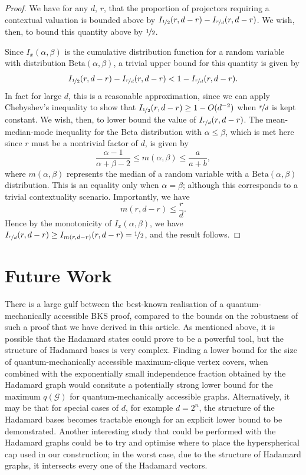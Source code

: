 \documentclass{amsart}
\theoremstyle{definition}
\begin{document}
\begin{proof}
We have for any $d$, $r$, that the proportion of projectors requiring a contextual valuation is bounded above by $I_{\nicefrac{1}{2}}(r,d-r)-I_{\nicefrac{r}{d}}(r,d-r)$. We wish, then, to bound this quantity above by $\nicefrac12$.

Since $I_x(\alpha,\beta)$ is the cumulative distribution function for a random variable with distribution $\mbox{Beta}(\alpha,\beta)$, a trivial upper bound for this quantity is given by
\begin{equation}
I_{\nicefrac{1}{2}}(r,d-r)-I_{\nicefrac{r}{d}}(r,d-r)< 1-I_{\nicefrac{r}{d}}(r,d-r).
\end{equation}
In fact for large $d$, this is a reasonable approximation, since we can apply Chebyshev's inequality to show that $I_{\nicefrac{1}{2}}(r,d-r)\geq1-O(d^{-2})$ when $\nicefrac{r}{d}$ is kept constant. We wish, then, to lower bound the value of $I_{\nicefrac{r}{d}}(r,d-r)$. The mean-median-mode inequality \cite{Kerm2011} for the Beta distribution with $\alpha\leq\beta$, which is met here since $r$ must be a nontrivial factor of $d$, is given by
\begin{equation}
\frac{\alpha-1}{\alpha+\beta-2}\leq m(\alpha,\beta)\leq\frac{a}{a+b},
\end{equation}
where $m(\alpha,\beta)$ represents the median of a random variable with a $\mbox{Beta}(\alpha,\beta)$ distribution. This is an equality only when $\alpha=\beta$; although this corresponds to a trivial contextuality scenario. Importantly, we have
\begin{equation}
m(r,d-r)\leq\frac{r}{d}.
\end{equation}
Hence by the monotonicity of $I_x(\alpha,\beta)$, we have $I_{\nicefrac{r}{d}}(r,d-r)\geq I_{m(r,d-r)}(r,d-r)=\nicefrac12$, and the result follows.

\end{proof}


\section{Future Work}
There is a large gulf between the best-known realisation of a quantum-mechanically accessible BKS proof, compared to the bounds on the robustness of such a proof that we have derived in this article. As mentioned above, it is possible that the Hadamard states could prove to be a powerful tool, but the structure of Hadamard bases is very complex. Finding a lower bound for the size of quantum-mechanically accessible maximum-clique vertex covers, when combined with the exponentially small independence fraction obtained by the Hadamard graph would consitute a potentially strong lower bound for the maximum $q(\mathcal{G})$ for quantum-mechanically accessible graphs. Alternatively, it may be that for special cases of $d$, for example $d=2^n$, the structure of the Hadamard bases becomes tractable enough for an explicit lower bound to be demonstrated. Another interesting study that could be performed with the Hadamard graphs could be to try and optimise where to place the hyperspherical cap used in our construction; in the worst case, due to the structure of Hadamard graphs, it intersects every one of the Hadamard vectors. %
\end{document}
